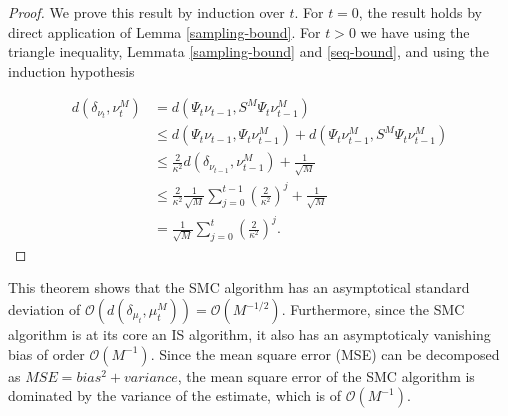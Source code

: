 \begin{proof}
  We prove this result by induction over $t$. For $t=0$, the result holds by direct application of Lemma \ref{sampling-bound}. For $t > 0$ we have using the triangle inequality, Lemmata \ref{sampling-bound} and \ref{seq-bound}, and using the induction hypothesis

  \begin{equation*}
    \begin{aligned}
      d(\delta_{\nu_t}, \nu_t^M)
      &= d(\Psi_t\nu_{t-1}, S^M\Psi_t\nu_{t-1}^M)\\
      &\le d(\Psi_t\nu_{t-1}, \Psi_t\nu_{t-1}^M) + d(\Psi_t\nu_{t-1}^M, S^M\Psi_t\nu_{t-1}^M)\\
      &\le \frac2{\kappa^2}d(\delta_{\nu_{t-1}}, \nu_{t-1}^M) + \frac1{\sqrt{M}}\\
      &\le \frac2{\kappa^2}\frac1{\sqrt{M}}\sum_{j=0}^{t-1}\left(\frac2{\kappa^2}\right)^j + \frac1{\sqrt{M}}\\
      &= \frac1{\sqrt{M}}\sum_{j=0}^t\left(\frac2{\kappa^2}\right)^j.
    \end{aligned}
  \end{equation*}
\end{proof}



This theorem shows that the SMC algorithm has an asymptotical standard deviation of $\mathcal{O}(d(\delta_{\mu_t}, \mu^M_t)) = \mathcal{O}(M^{-1/2})$. Furthermore, since the SMC algorithm is at its core an IS algorithm, it also has an asymptoticaly vanishing bias of order $\mathcal{O}(M^{-1})$. Since the mean square error (MSE) can be decomposed as $MSE = bias^2 + variance$, the mean square error of the SMC algorithm is dominated by the variance of the estimate, which is of $\mathcal{O}(M^{-1})$.

